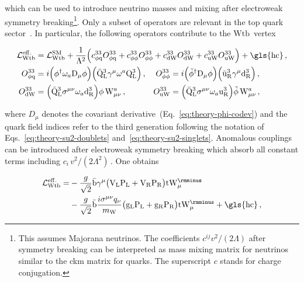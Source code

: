 which can be used to introduce neutrino masses and mixing after electroweak symmetry breaking\footnote{This assumes Majorana neutrinos. The coefficients $c^{ij} v^2/(2\Lambda)$ after symmetry breaking can be interpreted as mass mixing matrix for neutrinos similar to the \gls{ckm} matrix for quarks. The superscript $c$ stands for charge conjugation.}. Only a subset of operators are relevant in the top quark sector~\cite{AguilarSaavedra:2008zc}. In particular, the following operators contribute to the $\mathrm{Wtb}$~vertex


\begin{subequations}\label{eq:theory-eft-lagrangian-operators}
\begin{align}
\mathcal{L}^\mathrm{eff.}_\mathrm{Wtb}&=\mathcal{L}^\mathrm{SM}_\mathrm{Wtb}+\frac{1}{\Lambda^2}\Big(c_{\phi\mathrm{q}}^{33}O_{\phi\mathrm{q}}^{33}+c_{\phi\phi}^{33}O_{\phi\phi}^{33}+c_{\mathrm{dW}}^{33}O_{\mathrm{dW}}^{33}+c_{\mathrm{uW}}^{33}O_{\mathrm{uW}}^{33}\Big)+\mathrm{\gls{hc}}\,,\span\span \\ 
O_{\phi\mathrm{q}}^{33}&=i\Big(\phi^\dagger\omega_{a}\mathrm{D}_\mu\phi\Big)\Big(\bar{\mathrm{Q}}_\mathrm{L}^{3}\gamma^{\mu}\omega^{a}\mathrm{Q}_\mathrm{L}^{3}\Big)\,,&
O_{\phi\phi}^{33}&=i\Big(\tilde{\phi}^\dagger\mathrm{D}_\mu\phi\Big)\Big(\bar{\mathrm{u}}_\mathrm{R}^{3}\gamma^{\mu}\mathrm{d}_\mathrm{R}^{3}\Big)\,,\\
O_{\mathrm{dW}}^{33}&=\Big(\bar{\mathrm{Q}}_\mathrm{L}^{3}\sigma^{\mu\nu}\omega_{a}\mathrm{d}_\mathrm{R}^{3}\Big)\phi\,\mathrm{W}^{a}_{\mu\nu}\,,&
O_{\mathrm{uW}}^{33}&=\Big(\bar{\mathrm{Q}}_\mathrm{L}^{3}\sigma^{\mu\nu}\omega_{a}\mathrm{u}_\mathrm{R}^{3}\Big)\tilde{\phi}\,\mathrm{W}^{a}_{\mu\nu}\,,
\end{align}
\end{subequations}

where $D_\mu$ denotes the covariant derivative~(Eq.~\ref{eq:theory-phi-codev}) and the quark field indices refer to the third generation following the notation of Eqs.~\ref{eq:theory-su2-doublets} and~\ref{eq:theory-su2-singlets}. Anomalous couplings can be introduced after electroweak symmetry breaking which absorb all constant terms including $c_{i}\,v^2/(2\Lambda^2)$\,. One obtains

\begin{align}
\mathcal{L}^\mathrm{eff.}_\mathrm{Wtb}=&-\frac{g}{\sqrt{2}}\bar{\mathrm{b}}\gamma^{\mu}\big(\mathrm{V}_\mathrm{L}\mathrm{P}_\mathrm{L}+\mathrm{V}_\mathrm{R}\mathrm{P}_\mathrm{R}\big)\mathrm{t}\mathrm{W}_\mu^{\rmminus}\nonumber\\
&-\frac{g}{\sqrt{2}}\bar{\mathrm{b}}\frac{i\sigma^{\mu\nu}q_\nu}{m_\mathrm{W}}\big(\mathrm{g}_\mathrm{L}\mathrm{P}_\mathrm{L}+\mathrm{g}_\mathrm{R}\mathrm{P}_\mathrm{R}\big)\mathrm{t}\mathrm{W}_\mu^{\rmminus}+\mathrm{\gls{hc}}\,,\label{eq:theory-wtb-eff-anomcouplings}
\end{align}

